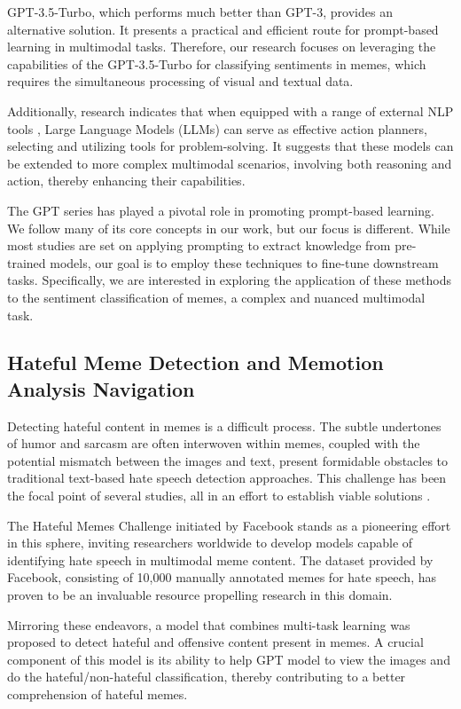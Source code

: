 \documentclass[conference]{IEEEtran}
\begin{document}
GPT-3.5-Turbo, which performs much better than GPT-3, provides an alternative solution. It presents a practical and efficient route for prompt-based learning in multimodal tasks. Therefore, our research focuses on leveraging the capabilities of the GPT-3.5-Turbo for classifying sentiments in memes, which requires the simultaneous processing of visual and textual data.

Additionally, research indicates that when equipped with a range of external NLP tools \cite{huang2022language, paranjape2023art}, Large Language Models (LLMs) can serve as effective action planners, selecting and utilizing tools for problem-solving. It suggests that these models can be extended to more complex multimodal scenarios, involving both reasoning and action, thereby enhancing their capabilities.

The GPT series has played a pivotal role in promoting prompt-based learning. We follow many of its core concepts in our work, but our focus is different. While most studies are set on applying prompting to extract knowledge from pre-trained models, our goal is to employ these techniques to fine-tune downstream tasks. Specifically, we are interested in exploring the application of these methods to the sentiment classification of memes, a complex and nuanced multimodal task.
\subsection{Hateful Meme Detection and Memotion Analysis Navigation}

Detecting hateful content in memes is a difficult process. The subtle undertones of humor and sarcasm are often interwoven within memes, coupled with the potential mismatch between the images and text, present formidable obstacles to traditional text-based hate speech detection approaches. This challenge has been the focal point of several studies, all in an effort to establish viable solutions \cite{chiu2021detecting, pramanick-etal-2021-momenta-multimodal, sharma2022detecting}.

The Hateful Memes Challenge initiated by Facebook stands as a pioneering effort in this sphere, inviting researchers worldwide to develop models capable of identifying hate speech in multimodal meme content. The dataset provided by Facebook, consisting of 10,000 manually annotated memes for hate speech, has proven to be an invaluable resource propelling research in this domain.

Mirroring these endeavors, a model that combines multi-task learning was proposed to detect hateful and offensive content present in memes. A crucial component of this model is its ability to help GPT model to view the images and do the hateful/non-hateful classification, thereby contributing to a better comprehension of hateful memes.
\end{document}
